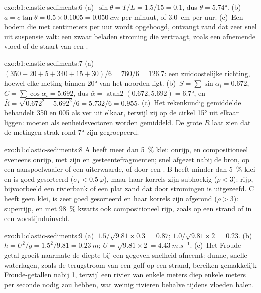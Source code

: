 \begin{solution}{exo:b1:clastic-sediments:6}
(a)~$\sin\theta = T/L = 1.5/15 = 0.1$, dus $\theta = \ang{5.74}$. (b)~$a =
c\tan\theta = 0.5 \times 0.1005 = \qty{0.050}{cm}$ per minuut, of
\qty{3.0}{cm} per uur. (c)~Een bodem die met centimeters per uur wordt opgehoogd, ontvangt
zand dat zeer snel uit suspensie valt: een zwaar beladen stroming die vertraagt, zoals een
afnemende vloed of de staart van een .
\end{solution}

\begin{solution}{exo:b1:clastic-sediments:7}
(a)~$(350 + 20 + 5 + 340 + 15 + 30)/6 = 760/6 = 126.7$: een zuidoostelijke
richting, hoewel elke meting binnen \ang{20} van het noorden ligt. (b)~$S =
\sum\sin\alpha_i = 0.672$, $C = \sum\cos\alpha_i = 5.692$, dus $\bar\alpha =
\operatorname{atan2}(0.672, 5.692) = \ang{6.7}$, en $\bar R =
\sqrt{0.672^2 + 5.692^2}/6 = 5.732/6 = 0.955$. (c)~Het rekenkundig gemiddelde behandelt
350 en 005 als ver uit elkaar, terwijl zij op de cirkel \ang{15} uit elkaar liggen:
 moeten als eenheidsvectoren worden gemiddeld. De grote $\bar R$ laat zien dat de
metingen strak rond \ang{7} zijn gegroepeerd.
\end{solution}

\begin{solution}{exo:b1:clastic-sediments:8}
A heeft meer dan \qty{5}{\percent} klei: onrijp, en compositioneel eveneens onrijp, met
zijn  en gesteentefragmenten; snel afgezet nabij de bron, op een aanspoelwaaier
of een uiterwaarde, of door een . B heeft minder dan \qty{5}{\percent}
klei en is goed gesorteerd ($\sigma_I < 0.5\,\varphi$), maar haar korrels zijn
subhoekig ($\rho < 3$): rijp, bijvoorbeeld een rivierbank of een plat zand dat door
stromingen is uitgezeefd. C heeft geen klei, is zeer goed gesorteerd en haar korrels zijn
afgerond ($\rho > 3$): superrijp, en met \qty{98}{\percent} kwarts ook compositioneel
rijp, zoals op een strand of in een woestijnduinveld.
\end{solution}

\begin{solution}{exo:b1:clastic-sediments:9}
(a)~$1.5/\sqrt{9.81 \times 0.3} = 0.87$; $1.0/\sqrt{9.81 \times 2} = 0.23$.
(b)~$h = U^2/g = 1.5^2/9.81 = \qty{0.23}{m}$; $U = \sqrt{9.81 \times 2} =
\qty{4.43}{m.s^{-1}}$. (c)~Het Froude-getal groeit naarmate de diepte bij een gegeven
snelheid afneemt: dunne, snelle waterlagen, zoals de terugstroom van een golf op een
strand, bereiken gemakkelijk Froude-getallen nabij 1, terwijl een rivier van enkele meters
diep enkele meters per seconde nodig zou hebben, wat weinig rivieren behalve tijdens
vloeden halen.
\end{solution}

